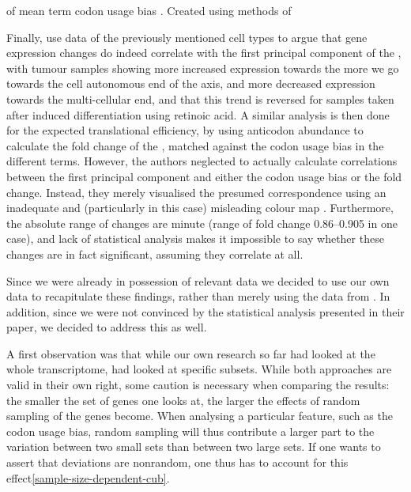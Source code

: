     {\pca of mean \go term codon usage bias}
    {. Created using methods of \citet{Gingold:2014}}


Finally, \citet{Gingold:2014} use \rnaseq data of the previously mentioned cell
types to argue that gene expression changes do indeed correlate with the first
principal component of the \pca, with tumour samples showing more increased
expression towards the more we go towards the cell autonomous end of the axis,
and more decreased expression towards the multi-cellular end, and that this
trend is reversed for samples taken after induced differentiation using retinoic
acid. A similar analysis is then done for the expected translational efficiency,
by using \trna anticodon abundance to calculate the fold change of the \tai,
matched against the codon usage bias in the different \go terms. However, the
authors neglected to actually calculate correlations between the first principal
component and either the codon usage bias or the \tai fold change. Instead, they
merely visualised the presumed correspondence using an inadequate and
(particularly in this case) misleading colour map \citep{Borland:2007}.
Furthermore, the absolute range of changes are minute (range of \tai fold change
\numrange{0.86}{0.905} in one case), and lack of statistical analysis makes it
impossible to say whether these changes are in fact significant, assuming they
correlate at all.

Since we were already in possession of relevant \trna data we decided to use our
own data to recapitulate these findings, rather than merely using the data from
\citet{Gingold:2014}. In addition, since we were not convinced by the
statistical analysis presented in their paper, we decided to address this as
well.

A first observation was that while our own research so far had looked at the
whole transcriptome, \citet{Gingold:2014} had looked at specific subsets. While
both approaches are valid in their own right, some caution is necessary when
comparing the results: the smaller the set of genes one looks at, the larger the
effects of random sampling of the genes become. When analysing a particular
feature, such as the codon usage bias, random sampling will thus contribute a
larger part to the variation between two small sets than between two large sets.
If one wants to assert that deviations are nonrandom, one thus has to account
for this effect\ref{sample-size-dependent-cub}.

